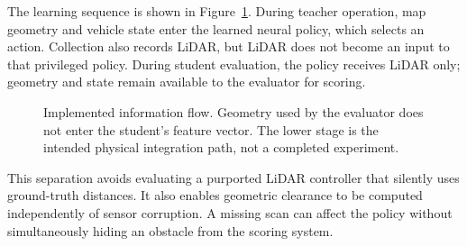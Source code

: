The learning sequence is shown in Figure~\ref{fig:pipeline}. During teacher
operation, map geometry and vehicle state enter the learned neural policy,
which selects an action. Collection
also records LiDAR, but LiDAR does not become an input to that privileged
policy. During student evaluation, the policy receives LiDAR only; geometry
and state remain available to the evaluator for scoring.

\begin{figure}[htbp]
\centering
{}
\caption[Teacher-to-student information flow]{Implemented information flow. Geometry used by the evaluator does
not enter the student's feature vector. The lower stage is the intended
physical integration path, not a completed experiment.}
\label{fig:pipeline}
\end{figure}

This separation avoids evaluating a purported LiDAR controller that silently
uses ground-truth distances. It also enables geometric clearance to be
computed independently of sensor corruption. A missing scan can affect the
policy without simultaneously hiding an obstacle from the scoring system.

